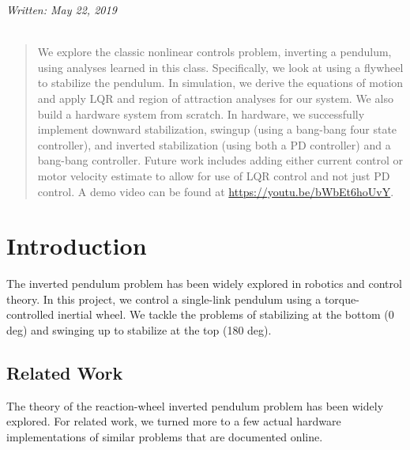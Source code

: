 \documentclass[conference]{IEEEtran}
\begin{document}
\maketitle
\noindent \textit{Written: May 22, 2019} \\ \\
\begin{abstract} We explore the classic nonlinear controls problem, inverting a
    pendulum, using analyses learned in this class. Specifically, we look at
    using a flywheel to stabilize the pendulum. In simulation, we derive the
    equations of motion and apply LQR and region of attraction analyses for our
    system. We also build a hardware system from scratch. In hardware, we
    successfully implement downward stabilization, swingup (using a bang-bang
    four state controller), and inverted stabilization (using both a PD
    controller) and a bang-bang controller. Future work includes adding either
    current control or motor velocity estimate to allow for use of LQR control 
    and not just PD control. A demo video can be found at \url{https://youtu.be/bWbEt6hoUvY}.
\end{abstract}


%
\IEEEpeerreviewmaketitle

\section{Introduction}
The inverted pendulum problem has been widely explored in robotics and control
theory. In this project, we control a single-link pendulum using a
torque-controlled inertial wheel. We tackle the problems of stabilizing at the
bottom (0 deg) and swinging up to stabilize at the top (180 deg). \\ 

\subsection{Related Work} The theory of the reaction-wheel inverted pendulum
problem has been widely explored. For related work, we turned more to a few
actual hardware implementations of similar problems that are documented online.
\end{document}
